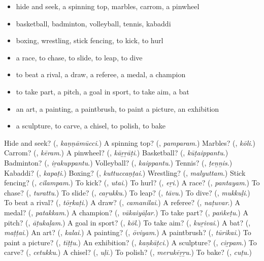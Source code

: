 \begin{itemize}
\raggedright
  \item hide and seek, a spinning top, marbles, carrom, a pinwheel
  \item basketball, badminton, volleyball, tennis, kabaddi
  \item boxing, wrestling, stick fencing, to kick, to hurl
  \item a race, to chase, to slide, to leap, to dive
  \item to beat a rival, a draw, a referee, a medal, a champion
  \item to take part, a pitch, a goal in sport, to take aim, a bat
  \item an art, a painting, a paintbrush, to paint a picture, an exhibition
  \item a sculpture, to carve, a chisel, to polish, to bake
\end{itemize}

\begin{tcolorbox}[breakable,colback=teal!4,colframe=teal!35!black,title={Before you move on}]
Hide and seek? (\textbf{}, \emph{kaṇṇāmūcci}.) A spinning top? (\textbf{}, \emph{pamparam}.) Marbles? (\textbf{}, \emph{kōli}.) Carrom? (\textbf{}, \emph{kēram}.) A pinwheel? (\textbf{}, \emph{kāṟṟāṭi}.) Basketball? (\textbf{}, \emph{kūṭaippantu}.) Badminton? (\textbf{}, \emph{iṟakuppantu}.) Volleyball? (\textbf{}, \emph{kaippantu}.) Tennis? (\textbf{}, \emph{ṭeṉṉis}.) Kabaddi? (\textbf{}, \emph{kapaṭi}.) Boxing? (\textbf{}, \emph{kuttuccaṇṭai}.) Wrestling? (\textbf{}, \emph{malyuttam}.) Stick fencing? (\textbf{}, \emph{cilampam}.) To kick? (\textbf{}, \emph{utai}.) To hurl? (\textbf{}, \emph{eṟi}.) A race? (\textbf{}, \emph{pantayam}.) To chase? (\textbf{}, \emph{turattu}.) To slide? (\textbf{}, \emph{caṟukku}.) To leap? (\textbf{}, \emph{tāvu}.) To dive? (\textbf{}, \emph{mukkuḷi}.) To beat a rival? (\textbf{}, \emph{tōṟkaṭi}.) A draw? (\textbf{}, \emph{camanilai}.) A referee? (\textbf{}, \emph{naṭuvar}.) A medal? (\textbf{}, \emph{patakkam}.) A champion? (\textbf{}, \emph{vākaiyāḷar}.) To take part? (\textbf{}, \emph{paṅkeṭu}.) A pitch? (\textbf{}, \emph{āṭukaḷam}.) A goal in sport? (\textbf{}, \emph{kōl}.) To take aim? (\textbf{}, \emph{kuṟivai}.) A bat? (\textbf{}, \emph{maṭṭai}.) An art? (\textbf{}, \emph{kalai}.) A painting? (\textbf{}, \emph{ōviyam}.) A paintbrush? (\textbf{}, \emph{tūrikai}.) To paint a picture? (\textbf{}, \emph{tīṭṭu}.) An exhibition? (\textbf{}, \emph{kaṇkāṭci}.) A sculpture? (\textbf{}, \emph{ciṟpam}.) To carve? (\textbf{}, \emph{cetukku}.) A chisel? (\textbf{}, \emph{uḷi}.) To polish? (\textbf{}, \emph{merukēṟṟu}.) To bake? (\textbf{}, \emph{cuṭu}.)
\end{tcolorbox}
